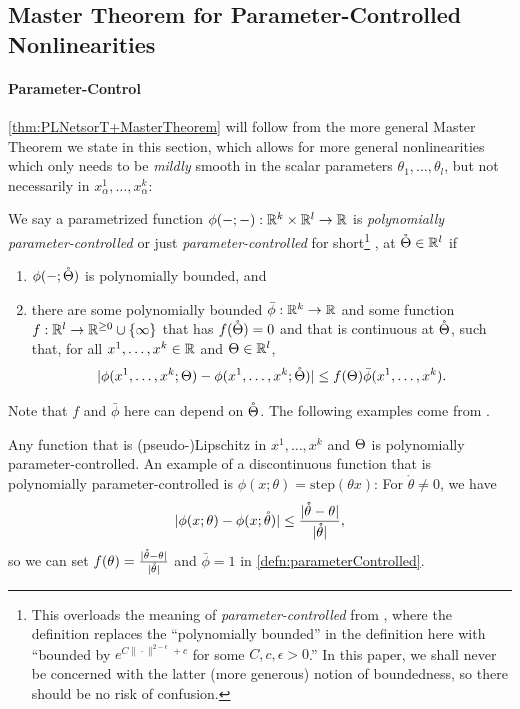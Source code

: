 \documentclass[main.tex]{subfiles}
\begin{document}
\subsection{\netsortplus{} Master Theorem for Parameter-Controlled Nonlinearities}

\paragraph{Parameter-Control}
\cref{thm:PLNetsorT+MasterTheorem} will follow from the more general Master Theorem we state in this section, which allows for more general nonlinearities which only needs to be \emph{mildly} smooth in the scalar parameters $\theta_1,\ldots, \theta_l$, but not necessarily in $x^1_\alpha, \ldots, x^k_\alpha$:

\begin{defn}\label{defn:parameterControlled} 
    We say a parametrized function $\phi(-;-):\mathbb{R}^{k}\times\mathbb{R}^{l}\to\mathbb{R}$ is \emph{polynomially parameter-controlled} or just \emph{parameter-controlled} for short\footnote{This overloads the meaning of \emph{parameter-controlled} from \citet{yangTP1}, where the definition replaces the ``polynomially bounded'' in the definition here with ``bounded by $e^{C\|\cdot\|^{2-\epsilon}+c}$ for some $C,c,\epsilon>0$.'' In this paper, we shall never be concerned with the latter (more generous) notion of boundedness, so there should be no risk of confusion.} , at $\mathring{\Theta}\in\mathbb{R}^{l}$ if 
\begin{enumerate}
\item $\phi(-;\mathring{\Theta})$ is polynomially bounded, and\label{item:parameterControlled1} 
\item there are some polynomially bounded $\bar{\phi}:\mathbb{R}^{k}\to\mathbb{R}$ and some function $f:\mathbb{R}^{l}\to\mathbb{R}^{\ge0}\cup\{\infty\}$ that has $f(\mathring{\Theta})=0$ and that is continuous at $\mathring{\Theta}$, such that, for all $x^{1},\ldots,x^{k}\in\mathbb{R}$ and $\Theta\in\mathbb{R}^{l}$, 
\[
|\phi(x^{1},\ldots,x^{k};\Theta)-\phi(x^{1},\ldots,x^{k};\mathring{\Theta})|\le f(\Theta)\bar{\phi}(x^{1},\ldots,x^{k}).
\]
\label{item:parameterControlled2} 
\end{enumerate}
 \end{defn} 

Note that $f$ and $\bar{\phi}$ here can depend on $\mathring{\Theta}$. The following examples come from \citet{yangTP1}. \begin{exmp}\label{exmp:parameterControl} 
    Any function that is (pseudo-)Lipschitz in $x^{1},\ldots,x^{k}$ and $\Theta$ is polynomially parameter-controlled.
    An example of a discontinuous function that is polynomially parameter-controlled is $\phi(x;\theta)=\mathrm{step}(\theta x)$: For $\mathring{\theta}\ne0$, we have
\[
|\phi(x;\theta)-\phi(x;\mathring{\theta})|\le\frac{|\mathring{\theta}-\theta|}{|\mathring{\theta}|},
\]
so we can set $f(\theta)=\frac{|\mathring{\theta}-\theta|}{|\mathring{\theta}|}$ and $\bar{\phi}=1$ in \cref{defn:parameterControlled}. \end{exmp}
\end{document}
